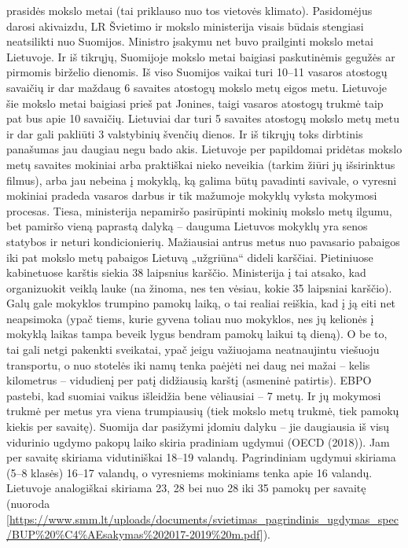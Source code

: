 \documentclass[]{article}
\begin{document}
prasidės mokslo metai (tai priklauso nuo tos vietovės klimato).
Pasidomėjus darosi akivaizdu, LR Švietimo ir mokslo ministerija visais
būdais stengiasi neatsilikti nuo Suomijos. Ministro įsakymu net buvo
prailginti mokslo metai Lietuvoje. Ir iš tikrųjų, Suomijoje mokslo metai
baigiasi paskutinėmis gegužės ar pirmomis birželio dienomis. Iš viso
Suomijos vaikai turi 10--11 vasaros atostogų savaičių ir dar maždaug 6
savaites atostogų mokslo metų eigos metu. Lietuvoje šie mokslo metai
baigiasi prieš pat Jonines, taigi vasaros atostogų trukmė taip pat bus
apie 10 savaičių. Lietuviai dar turi 5 savaites atostogų mokslo metų
metu ir dar gali pakliūti 3 valstybinių švenčių dienos. Ir iš tikrųjų
toks dirbtinis panašumas jau daugiau negu bado akis. Lietuvoje per
papildomai pridėtas mokslo metų savaites mokiniai arba praktiškai nieko
neveikia (tarkim žiūri jų išsirinktus filmus), arba jau nebeina į
mokyklą, ką galima būtų pavadinti savivale, o vyresni mokiniai pradeda
vasaros darbus ir tik mažumoje mokyklų vyksta mokymosi procesas. Tiesa,
ministerija nepamiršo pasirūpinti mokinių mokslo metų ilgumu, bet
pamiršo vieną paprastą dalyką -- dauguma Lietuvos mokyklų yra senos
statybos ir neturi kondicionierių. Mažiausiai antrus metus nuo pavasario
pabaigos iki pat mokslo metų pabaigos Lietuvą „užgriūna`` dideli
karščiai. Pietiniuose kabinetuose karštis siekia 38 laipsnius karščio.
Ministerija į tai atsako, kad organizuokit veiklą lauke (na žinoma, nes
ten vėsiau, kokie 35 laipsniai karščio). Galų gale mokyklos trumpino
pamokų laiką, o tai realiai reiškia, kad į ją eiti net neapsimoka (ypač
tiems, kurie gyvena toliau nuo mokyklos, nes jų kelionės į mokyklą
laikas tampa beveik lygus bendram pamokų laikui tą dieną). O be to, tai
gali netgi pakenkti sveikatai, ypač jeigu važiuojama neatnaujintu
viešuoju transportu, o nuo stotelės iki namų tenka paėjėti nei daug nei
mažai -- kelis kilometrus -- vidudienį per patį didžiausią karštį
(asmeninė patirtis). EBPO pastebi, kad suomiai vaikus išleidžia bene
vėliausiai -- 7 metų. Ir jų mokymosi trukmė per metus yra viena
trumpiausių (tiek mokslo metų trukmė, tiek pamokų kiekis per savaitę).
Suomija dar pasižymi įdomiu dalyku -- jie daugiausia iš visų vidurinio
ugdymo pakopų laiko skiria pradiniam ugdymui (OECD (2018)). Jam per
savaitę skiriama vidutiniškai 18--19 valandų. Pagrindiniam ugdymui
skiriama (5--8 klasės) 16--17 valandų, o vyresniems mokiniams tenka apie
16 valandų. Lietuvoje analogiškai skiriama 23, 28 bei nuo 28 iki 35
pamokų per savaitę (nuoroda
{[}\url{https://www.smm.lt/uploads/documents/svietimas_pagrindinis_ugdymas_spec/BUP\%20\%C4\%AEsakymas\%202017-2019\%20m.pdf}{]}).
\end{document}
